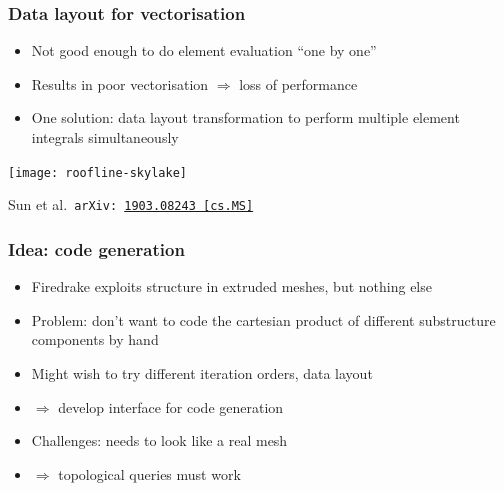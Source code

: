 \documentclass[presentation,aspectratio=43, 10pt]{beamer}
\newcommand{\arxivlink}[2]{{\texttt{arXiv:\,\href{https://arxiv.org/abs/#1}{#1\,[#2]}}}}
\begin{document}
\begin{frame}
  \frametitle{Data layout for vectorisation}
  \begin{itemize}
  \item Not good enough to do element evaluation ``one by one''
  \item Results in poor vectorisation $\Rightarrow$ loss of
    performance
  \item One solution: data layout transformation to perform multiple
    element integrals simultaneously
  \end{itemize}
  \begin{center}
    \texttt{[image: roofline-skylake]}
  \end{center}
      \begin{flushright}
        {\footnotesize Sun et al.~\arxivlink{1903.08243}{cs.MS}}
      \end{flushright}
\end{frame}

\begin{frame}
  \frametitle{Idea: code generation}
  \begin{itemize}
  \item Firedrake exploits structure in extruded meshes, but nothing
    else
  \item Problem: don't want to code the cartesian product of different
    substructure components by hand
  \item Might wish to try different iteration orders, data layout
    
  \item $\Rightarrow$ develop interface for code generation
  \item Challenges: needs to look like a real mesh
  \item $\Rightarrow$ topological queries must work
  \end{itemize}
\end{frame}
\end{document}
